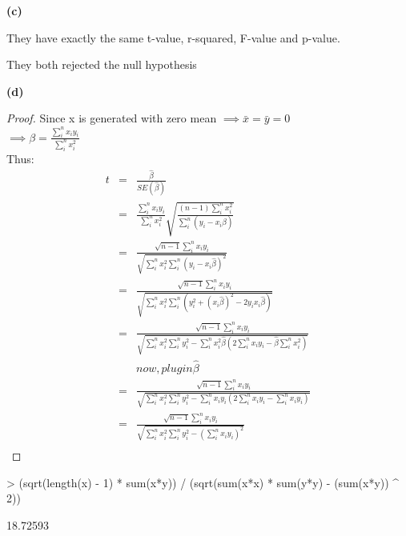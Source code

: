 \documentclass[a4paper]{article}
\renewcommand{\part}[1] {\vspace{.10in} {\bf (#1)}}
\begin{document}
\part{c}
\begin{enumerate}
{\color{red}
\item They have exactly the same t-value, r-squared, F-value and p-value.
\item They both rejected the null hypothesis
}
\end{enumerate}


\part{d}
\begin{proof}
Since x is generated with zero mean $\implies \bar{x} = \bar{y} = 0$\\
$\implies \beta = \frac{\sum_{i}^{n} x_iy_i}{\sum_{i}^{n}x_i^2}$\\
Thus:
\begin{eqnarray*}
t &=&\frac{\hat{\beta}}{SE(\hat{\beta})}\\
  &=&\frac{\sum_{i}^{n} x_iy_i}{\sum_{i}^{n}x_i^2} \sqrt{\frac{(n-1)\sum_i^n x_i^2}{\sum_i^n (y_i-x_i\hat{\beta})}}\\
  &=&\frac{\sqrt{n-1}\sum_i^n x_iy_i}{\sqrt{\sum_i^n x_i^2 \sum_i^n (y_i - x_i \hat{\beta})^2}}\\
  &=&\frac{\sqrt{n-1}\sum_i^n x_iy_i}{\sqrt{\sum_i^n x_i^2 \sum_i^n (y_i^2 + (x_i\hat{\beta})^2 - 2y_ix_i\hat{\beta})}}\\
  &=&\frac{\sqrt{n-1}\sum_i^n x_iy_i}{\sqrt{\sum_i^nx_i^2\sum_i^ny_i^2 - \sum_i^nx_i^2\hat{\beta}(2\sum_i^nx_iy_i - \hat{\beta}\sum_i^nx_i^2)}}\\
  &&now, plug in \hat{\beta}\\
  &=& \frac{\sqrt{n-1}\sum_i^n x_iy_i}{\sqrt{\sum_i^nx_i^2\sum_i^ny_i^2 - \sum_i^nx_iy_i(2\sum_i^nx_iy_i - \sum_i^nx_iy_i)}}\\
  &=& \frac{\sqrt{n-1}\sum_i^n x_iy_i}{\sqrt{\sum_i^nx_i^2\sum_i^ny_i^2 - (\sum_i^nx_iy_i)^2}}\\
\end{eqnarray*}
\end{proof}
\begin{Schunk}
\begin{Sinput}
> (sqrt(length(x) - 1) * sum(x*y)) / (sqrt(sum(x*x) * sum(y*y) - (sum(x*y)) ^ 2))
\end{Sinput}
\begin{Soutput}
[1] 18.72593
\end{Soutput}
\end{Schunk}
\end{document}

